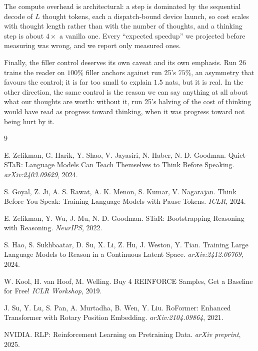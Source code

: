 \documentclass{article} %
\begin{document}
The compute overhead is architectural: a step is dominated by the sequential decode of $L$ thought tokens, each a dispatch-bound device launch, so cost scales with thought length rather than with the number of thoughts, and a thinking step is about $4\times$ a vanilla one. Every ``expected speedup'' we projected before measuring was wrong, and we report only measured ones.

Finally, the filler control deserves its own caveat and its own emphasis. Run 26 trains the reader on $100\%$ filler anchors against run 25's $75\%$, an asymmetry that favours the control; it is far too small to explain $1.5$ nats, but it is real. In the other direction, the same control is the reason we can say anything at all about what our thoughts are worth: without it, run 25's halving of the cost of thinking would have read as progress toward thinking, when it was progress toward not being hurt by it.

\begin{thebibliography}{9}

E. Zelikman, G. Harik, Y. Shao, V. Jayasiri, N. Haber, N. D. Goodman.
\newblock Quiet-STaR: Language Models Can Teach Themselves to Think Before Speaking.
\newblock \emph{arXiv:2403.09629}, 2024.

S. Goyal, Z. Ji, A. S. Rawat, A. K. Menon, S. Kumar, V. Nagarajan.
\newblock Think Before You Speak: Training Language Models with Pause Tokens.
\newblock \emph{ICLR}, 2024.

E. Zelikman, Y. Wu, J. Mu, N. D. Goodman.
\newblock STaR: Bootstrapping Reasoning with Reasoning.
\newblock \emph{NeurIPS}, 2022.

S. Hao, S. Sukhbaatar, D. Su, X. Li, Z. Hu, J. Weston, Y. Tian.
\newblock Training Large Language Models to Reason in a Continuous Latent Space.
\newblock \emph{arXiv:2412.06769}, 2024.

W. Kool, H. van Hoof, M. Welling.
\newblock Buy 4 REINFORCE Samples, Get a Baseline for Free!
\newblock \emph{ICLR Workshop}, 2019.

J. Su, Y. Lu, S. Pan, A. Murtadha, B. Wen, Y. Liu.
\newblock RoFormer: Enhanced Transformer with Rotary Position Embedding.
\newblock \emph{arXiv:2104.09864}, 2021.

NVIDIA.
\newblock RLP: Reinforcement Learning on Pretraining Data.
\newblock \emph{arXiv preprint}, 2025.

\end{thebibliography}
\end{document}
